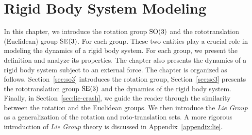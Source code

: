 
\chapter{Rigid Body System Modeling\label{chapter:rigid_base_system_modeling}}  %


In this chapter, we introduce the rotation group $\mathrm{SO}(3)$ and the rototranslation (Euclidean) group ${\mathrm{SE}}(3)$. For each group. These two entities play a crucial role in modeling the dynamics of a rigid body system. For each group, we present the definition and analyze its properties.
The chapter also presents the dynamics of a rigid body system subject to an external force.
The chapter is organized as follows. Section~\ref{sec:so3} introduces the rotation group, Section~\ref{sec:se3} presents the rototranslation group ${\mathrm{SE}}(3)$ and the dynamics of the rigid body system. Finally, in Section~\ref{sec:lie-crash}, we guide the reader through the similarity between the rotation and the Euclidean groups. We then introduce the \emph{Lie Group} as a generalization of the rotation and roto-translation sets. 
A more rigorous introduction of \emph{Lie Group} theory is discussed in Appendix~\ref{appendix:lie}.



